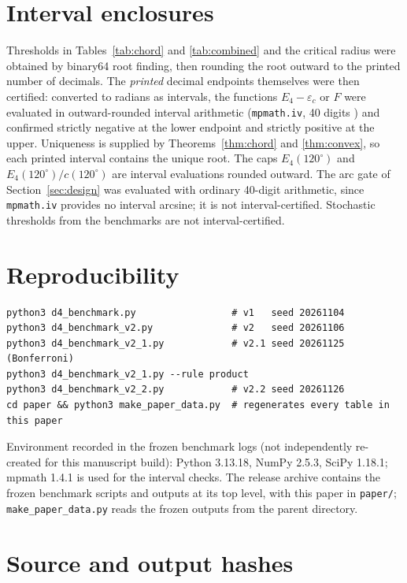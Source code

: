 \documentclass[11pt]{article}
\theoremstyle{definition}
\newcommand{\eps}{\varepsilon}
\begin{document}
\section{Interval enclosures}\label{app:iv}
Thresholds in Tables~\ref{tab:chord} and \ref{tab:combined} and the critical radius were obtained by binary64 root finding, then rounding the root outward to the printed number of decimals. The \emph{printed} decimal endpoints themselves were then certified: converted to radians as intervals, the functions $E_4-\eps_c$ or $F$ were evaluated in outward-rounded interval arithmetic (\texttt{mpmath.iv}, 40 digits \cite{mpmath,moore}) and confirmed strictly negative at the lower endpoint and strictly positive at the upper. Uniqueness is supplied by Theorems~\ref{thm:chord} and \ref{thm:convex}, so each printed interval contains the unique root. The caps $E_4(120^\circ)$ and $E_4(120^\circ)/c(120^\circ)$ are interval evaluations rounded outward. The arc gate of Section~\ref{sec:design} was evaluated with ordinary 40-digit arithmetic, since \texttt{mpmath.iv} provides no interval arcsine; it is not interval-certified. Stochastic thresholds from the benchmarks are not interval-certified.

\section{Reproducibility}\label{app:repro}
\begin{verbatim}
python3 d4_benchmark.py                 # v1   seed 20261104
python3 d4_benchmark_v2.py              # v2   seed 20261106
python3 d4_benchmark_v2_1.py            # v2.1 seed 20261125 (Bonferroni)
python3 d4_benchmark_v2_1.py --rule product
python3 d4_benchmark_v2_2.py            # v2.2 seed 20261126
cd paper && python3 make_paper_data.py  # regenerates every table in this paper
\end{verbatim}
Environment recorded in the frozen benchmark logs (not independently re-created for this manuscript build): Python 3.13.18, NumPy 2.5.3, SciPy 1.18.1; mpmath 1.4.1 is used for the interval checks. The release archive contains the frozen benchmark scripts and outputs at its top level, with this paper in \texttt{paper/}; \texttt{make\_paper\_data.py} reads the frozen outputs from the parent directory.

\section{Source and output hashes}\label{app:hash}
{\small}
\end{document}
